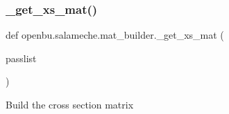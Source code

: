 \subsubsection{\texorpdfstring{\+\_\+get\+\_\+xs\+\_\+mat()}{\_get\_xs\_mat()}}
{\footnotesize\ttfamily def openbu.\+salameche.\+mat\+\_\+builder.\+\_\+get\+\_\+xs\+\_\+mat (\begin{DoxyParamCaption}\item[{}]{passlist }\end{DoxyParamCaption})\hspace{0.3cm}{\ttfamily [private]}}

\begin{DoxyVerb}Build the cross section matrix\end{DoxyVerb}
 